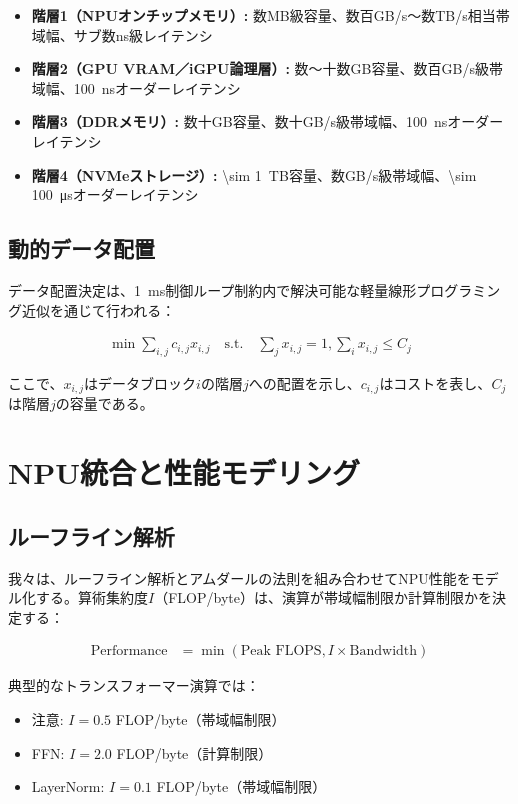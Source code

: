 \documentclass[10pt,twocolumn,a4paper]{jarticle}
\begin{document}
\begin{itemize}
\item \textbf{階層1（NPUオンチップメモリ）:} 数MB級容量、数百GB/s～数TB/s相当帯域幅、サブ数ns級レイテンシ
\item \textbf{階層2（GPU VRAM／iGPU論理層）:} 数～十数GB容量、数百GB/s級帯域幅、\SI{100}{ns}オーダーレイテンシ  
\item \textbf{階層3（DDRメモリ）:} 数十GB容量、数十GB/s級帯域幅、\SI{100}{ns}オーダーレイテンシ
\item \textbf{階層4（NVMeストレージ）:} \SI{\sim 1}{TB}容量、数GB/s級帯域幅、\SI{\sim 100}{\micro s}オーダーレイテンシ
\end{itemize}

\subsection{動的データ配置}

データ配置決定は、\SI{1}{ms}制御ループ制約内で解決可能な軽量線形プログラミング近似を通じて行われる：

\begin{align}
\min \sum_{i,j} c_{i,j} x_{i,j} \quad \text{s.t.} \quad \sum_j x_{i,j} = 1, \sum_i x_{i,j} \leq C_j \label{eq:placement}
\end{align}

ここで、$x_{i,j}$はデータブロック$i$の階層$j$への配置を示し、$c_{i,j}$はコストを表し、$C_j$は階層$j$の容量である。

\section{NPU統合と性能モデリング}

\subsection{ルーフライン解析}

我々は、ルーフライン解析とアムダールの法則を組み合わせてNPU性能をモデル化する。算術集約度$I$（FLOP/byte）は、演算が帯域幅制限か計算制限かを決定する：

\begin{align}
\text{Performance} &= \min(\text{Peak FLOPS}, I \times \text{Bandwidth}) \label{eq:roofline}
\end{align}

典型的なトランスフォーマー演算では：
\begin{itemize}
\item 注意: $I = 0.5$ FLOP/byte（帯域幅制限）
\item FFN: $I = 2.0$ FLOP/byte（計算制限）
\item LayerNorm: $I = 0.1$ FLOP/byte（帯域幅制限）
\end{itemize}
\end{document}

